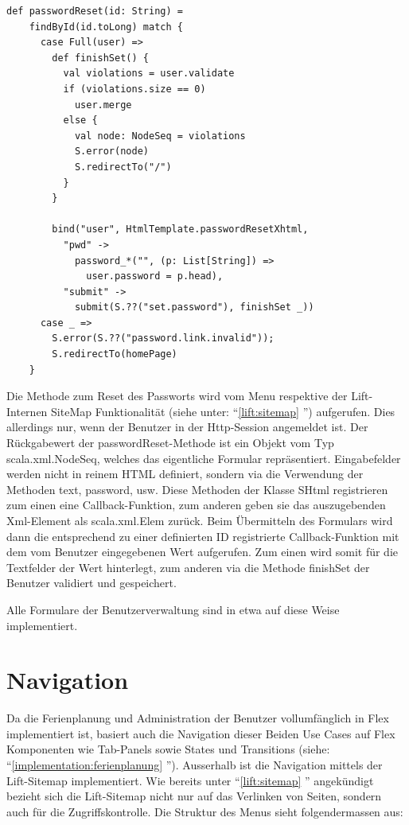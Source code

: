 \begin{lstlisting}[caption=Implementation Funktionalit\"at Passwort-Reset]
def passwordReset(id: String) =
    findById(id.toLong) match {
      case Full(user) =>
        def finishSet() {
          val violations = user.validate
          if (violations.size == 0)
            user.merge
          else {
            val node: NodeSeq = violations
            S.error(node)
            S.redirectTo("/")
          }
        }

        bind("user", HtmlTemplate.passwordResetXhtml,
          "pwd" -> 
            password_*("", (p: List[String]) =>
              user.password = p.head),
          "submit" -> 
            submit(S.??("set.password"), finishSet _))
      case _ => 
        S.error(S.??("password.link.invalid")); 
        S.redirectTo(homePage)
    }
\end{lstlisting}
Die Methode zum Reset des Passworts wird vom Menu respektive der Lift-Internen SiteMap Funktionalit\"at (siehe unter: ``\ref{lift:sitemap} '') aufgerufen. Dies allerdings nur, wenn der Benutzer in der Http-Session angemeldet ist.  Der R\"uckgabewert der passwordReset-Methode ist ein Objekt vom Typ scala.xml.NodeSeq, welches das eigentliche Formular repr\"asentiert. Eingabefelder werden nicht in reinem HTML definiert, sondern via die Verwendung der Methoden text, password, usw. Diese Methoden der Klasse SHtml registrieren zum einen eine Callback-Funktion, zum anderen geben sie das auszugebenden Xml-Element als scala.xml.Elem zur\"uck. Beim \"Ubermitteln des Formulars wird dann die entsprechend zu einer definierten ID registrierte Callback-Funktion mit dem vom Benutzer eingegebenen Wert aufgerufen. Zum einen wird somit f\"ur die Textfelder der Wert hinterlegt, zum anderen via die Methode finishSet der Benutzer validiert und gespeichert. 

Alle Formulare der Benutzerverwaltung sind in etwa auf diese Weise implementiert. 

\section{Navigation}
Da die Ferienplanung und Administration der Benutzer vollumf\"anglich in Flex implementiert ist, basiert auch die Navigation dieser Beiden Use Cases auf Flex Komponenten wie Tab-Panels sowie States und Transitions (siehe: ``\ref{implementation:ferienplanung} '').  Ausserhalb ist die Navigation mittels der Lift-Sitemap implementiert. Wie bereits unter ``\ref{lift:sitemap} '' angek\"undigt bezieht sich die Lift-Sitemap nicht nur auf das Verlinken von Seiten, sondern auch f\"ur die Zugriffskontrolle. Die Struktur des Menus sieht folgendermassen aus:

